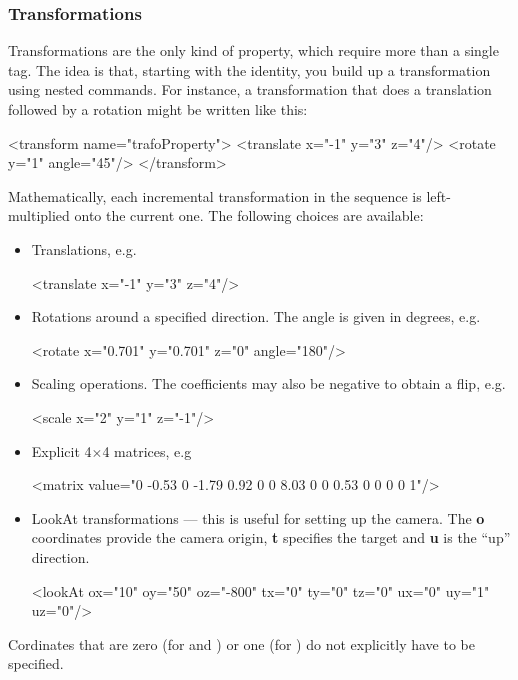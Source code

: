 \subsubsection{Transformations}
Transformations are the only kind of property, which require more than a single tag. The idea is that, starting
with the identity, you build up a transformation using nested commands. For instance, a transformation that 
does a translation followed by a rotation might be written like this:
\begin{xml}
<transform name="trafoProperty">
	<translate x="-1" y="3" z="4"/>
	<rotate y="1" angle="45"/>
</transform>
\end{xml}
Mathematically, each incremental transformation in the sequence is left-multiplied onto the current one. The following
choices are available:
\begin{itemize}
\item Translations, e.g.
\begin{xml}
<translate x="-1" y="3" z="4"/>
\end{xml}
\item Rotations around a specified direction. The angle is given in degrees, e.g.
\begin{xml}
<rotate x="0.701" y="0.701" z="0" angle="180"/>
\end{xml}
\item Scaling operations. The coefficients may also be negative to obtain a flip, e.g.
\begin{xml}
<scale x="2" y="1" z="-1"/>
\end{xml}
\item Explicit 4$\times$4 matrices, e.g
\begin{xml}
<matrix value="0 -0.53 0 -1.79 0.92 0 0 8.03 0 0 0.53 0 0 0 0 1"/>
\end{xml}
\item LookAt transformations --- this is useful for setting up the camera. The \textbf{o} coordinates
provide the camera origin, \textbf{t} specifies the target and \textbf{u} is the ``up'' direction.
\begin{xml}
<lookAt ox="10" oy="50" oz="-800" tx="0" ty="0" tz="0" ux="0" uy="1" uz="0"/>
\end{xml}
\end{itemize}
Cordinates that are zero (for  and ) or one (for )
do not explicitly have to be specified.
\newpage
